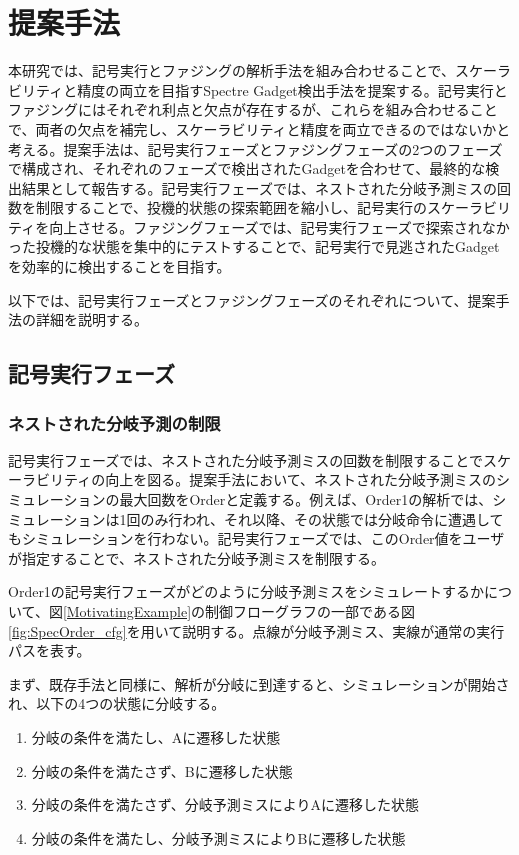 \section{提案手法}
本研究では、記号実行とファジングの解析手法を組み合わせることで、スケーラビリティと精度の両立を目指すSpectre Gadget検出手法を提案する。記号実行とファジングにはそれぞれ利点と欠点が存在するが、これらを組み合わせることで、両者の欠点を補完し、スケーラビリティと精度を両立できるのではないかと考える。提案手法は、記号実行フェーズとファジングフェーズの2つのフェーズで構成され、それぞれのフェーズで検出されたGadgetを合わせて、最終的な検出結果として報告する。記号実行フェーズでは、ネストされた分岐予測ミスの回数を制限することで、投機的状態の探索範囲を縮小し、記号実行のスケーラビリティを向上させる。ファジングフェーズでは、記号実行フェーズで探索されなかった投機的な状態を集中的にテストすることで、記号実行で見逃されたGadgetを効率的に検出することを目指す。\par
以下では、記号実行フェーズとファジングフェーズのそれぞれについて、提案手法の詳細を説明する。

\subsection{記号実行フェーズ}
\subsubsection{ネストされた分岐予測の制限}
記号実行フェーズでは、ネストされた分岐予測ミスの回数を制限することでスケーラビリティの向上を図る。提案手法において、ネストされた分岐予測ミスのシミュレーションの最大回数をOrderと定義する\cite{oleksenko2020specfuzz}。例えば、Order1の解析では、シミュレーションは1回のみ行われ、それ以降、その状態では分岐命令に遭遇してもシミュレーションを行わない。記号実行フェーズでは、このOrder値をユーザが指定することで、ネストされた分岐予測ミスを制限する。\par
Order1の記号実行フェーズがどのように分岐予測ミスをシミュレートするかについて、図\ref{MotivatingExample}の制御フローグラフの一部である図\ref{fig:SpecOrder_cfg}を用いて説明する。点線が分岐予測ミス、実線が通常の実行パスを表す。\par
まず、既存手法と同様に、解析が分岐に到達すると、シミュレーションが開始され、以下の4つの状態に分岐する。\par

\begin{enumerate}
  \item 分岐の条件を満たし、Aに遷移した状態
  \item 分岐の条件を満たさず、Bに遷移した状態
  \item 分岐の条件を満たさず、分岐予測ミスによりAに遷移した状態
  \item 分岐の条件を満たし、分岐予測ミスによりBに遷移した状態
\end{enumerate}

